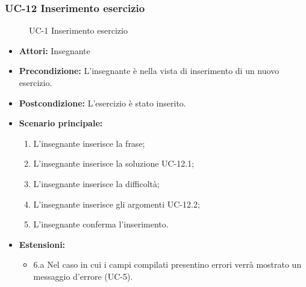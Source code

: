 \subsubsection{UC-12 Inserimento esercizio}
\begin{figure}[htbp]
	\centering
	\caption{UC-1 Inserimento esercizio}
\end{figure}
	\begin{itemize}
		\item \textbf{Attori: }Insegnante
		\item \textbf{Precondizione: }L'insegnante è nella vista di inserimento di un nuovo esercizio.
		\item \textbf{Postcondizione: }L'esercizio è stato inserito.
		\item \textbf{Scenario principale: }
		\begin{enumerate} 
		\item L'insegnante inserisce la frase;
		\item L'insegnante inserisce la soluzione UC-12.1;
		\item L'insegnante inserisce la difficoltà;
		\item L'insegnante inserisce gli argomenti UC-12.2;
		\item L'insegnante conferma l'inserimento.
		\end{enumerate}
		\item \textbf{Estensioni: }
		\begin{itemize}
		\item 6.a Nel caso in cui i campi compilati presentino errori verrà mostrato un messaggio d'errore (UC-5).
		\end{itemize}
	\end{itemize}

